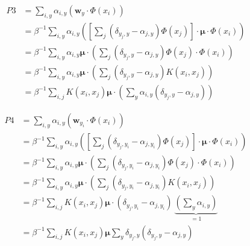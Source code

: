 \documentclass{article}
\begin{document}
\begin{align}
    P3 & = \sum_{i, y} \alpha_{i, y} \left(\mathbf{w}_{y} \cdot \Phi\left(x_{i}\right)\right) \\
       & = \beta^{-1} \sum_{i, y} \alpha_{i, y}
    \left(
    \left[
        \sum_{j}\left(\delta_{y_{j}, y}-\alpha_{j, y}\right) \Phi({x}_{j})
        \right]
    \cdot \bm{\mu} \cdot \Phi\left(x_{i}\right)
    \right)                                                                                   \\
       & = \beta^{-1}\sum_{i, y} \alpha_{i, y} \bm{\mu} \cdot
    \left(
    \sum_{j}\left(\delta_{y_{j}, y}-\alpha_{j, y}\right) \Phi({x}_{j})
    \cdot \Phi\left(x_{i}\right)
    \right)                                                                                   \\
       & =\beta^{-1} \sum_{i, y} \alpha_{i, y} \bm{\mu} \cdot
    \left(
    \sum_{j}\left(\delta_{y_{j}, y}-\alpha_{j, y}\right) K(x_i, x_j)
    \right)                                                                                   \\
       & = \beta^{-1} \sum_{i, j} K(x_i, x_j) \bm{\mu}
    \cdot
    \left(
    \sum_{y} \alpha_{i, y} \left(\delta_{y_{j}, y}-\alpha_{j, y}\right)
    \right)
\end{align}

\begin{align}
    P4 & = \sum_{i, y} \alpha_{i, y} \left(\mathbf{w}_{y_{i}} \cdot \Phi\left(x_{i}\right)\right) \\
       & = \beta^{-1} \sum_{i, y} \alpha_{i, y}
    \left(
    \left[
        \sum_{j}\left(\delta_{y_{j}, y_i}-\alpha_{j, y_i}\right) \Phi({x}_{j})
        \right]
    \cdot \bm{\mu} \cdot \Phi\left(x_{i}\right)
    \right)                                                                                       \\
       & = \beta^{-1} \sum_{i, y} \alpha_{i, y} \bm{\mu} \cdot
    \left(
    \sum_{j}\left(\delta_{y_{j}, y_i}-\alpha_{j, y_i}\right) \Phi({x}_{j})
    \cdot \Phi\left(x_{i}\right)
    \right)                                                                                       \\
       & = \beta^{-1} \sum_{i, y} \alpha_{i, y} \bm{\mu} \cdot
    \left(
    \sum_{j}\left(\delta_{y_{j}, y_i}-\alpha_{j, y_i}\right) K(x_i, x_j)
    \right)                                                                                       \\
       & = \beta^{-1} \sum_{i, j} K(x_i, x_j) \bm{\mu}
    \cdot
    \left(\delta_{y_{j}, y_i}-\alpha_{j, y_i}\right)\
    \underbrace{
        \left(
        \sum_{y} \alpha_{i, y}
        \right)
    }_{=1}                                                                                        \\
       & = \beta^{-1} \sum_{i, j} K(x_i, x_j) \bm{\mu}
    \sum_{y} \delta_{y_{j}, y} (\delta_{y_{j}, y}-\alpha_{j, y})
\end{align}
\end{document}
